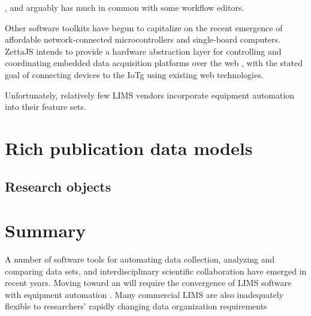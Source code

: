 \documentclass[../thesis]{subfiles}
\begin{document}
, and arguably has much in common
with some workflow editors.

Other software toolkits have begun to capitalize on
the recent emergence of affordable network-connected microcontrollers
and single-board computers.
ZettaJS intends to provide a hardware abstraction layer for
controlling and coordinating embedded data acquisition platforms over
the web \cite{ZettaJS}, with the stated goal of connecting devices to
the \gls{IoTg} using existing web technologies.


Unfortunately, relatively few \gls{LIMS} vendors incorporate equipment
automation into their feature sets.



\section{Rich publication data models}

\subsection{Research objects}







\section{Summary}

A number of software tools for automating data collection, analyzing
and comparing data sets, and interdisciplinary scientific
collaboration have emerged in recent years. Moving toward an    will
require the convergence of \gls{LIMS} software with equipment automation .
Many commercial \gls{LIMS} are also inadequately flexible to researchers'
rapidly changing data organization requirements
\end{document}
